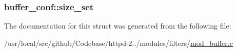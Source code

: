 \subsubsection[{\texorpdfstring{size\+\_\+set}{size_set}}]{ buffer\+\_\+conf\+::size\+\_\+set}\hypertarget{structbuffer__conf_a48a6ff9dfa80198954128a6c773a68db}{}\label{structbuffer__conf_a48a6ff9dfa80198954128a6c773a68db}


The documentation for this struct was generated from the following file\+:\begin{DoxyCompactItemize}
\item 
/usr/local/src/github/\+Codebase/httpd-\/2../modules/filters/\hyperlink{mod__buffer_8c}{mod\+\_\+buffer.\+c}\end{DoxyCompactItemize}
